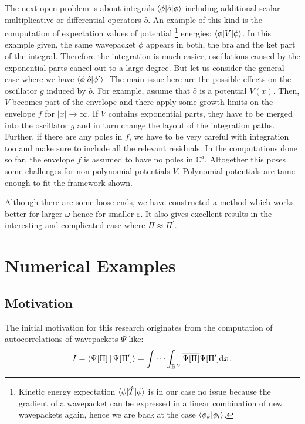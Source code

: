 \documentclass[a4paper,10pt]{article}
\begin{document}
The next open problem is about integrals $\braket{\phi|\hat{o}|\phi}$ including
additional scalar multiplicative or differential operators $\hat{o}$. An example
of this kind is the computation of expectation values of potential
\footnote{Kinetic energy
expectation $\braket{\phi|\hat{T}|\phi}$ is in our case no issue because the
gradient of a wavepacket can be expressed in a linear combination of new wavepackets
again, hence we are back at the case $\braket{\phi_k|\phi_l}$.}
energies: $\braket{\phi|V|\phi}$.
In this example given, the same wavepacket $\phi$ appears in both, the bra and the
ket part of the integral. Therefore the integration is much easier, oscillations
caused by the exponential parts cancel out to a large degree. But let us consider
the general case where we have $\braket{\phi|\hat{o}|\phi^\prime}$. The main issue
here are the possible effects on the oscillator $g$ induced by $\hat{o}$. For example,
assume that $\hat{o}$ is a potential $V(x)$. Then, $V$ becomes part of the envelope
and there apply some growth limits on the envelope $f$ for $|x| \rightarrow \infty$.
If $V$ contains exponential parts, they have to be merged into the oscillator $g$ and
in turn change the layout of the integration paths. Further, if there are any poles
in $f$, we have to be very careful with integration too and make sure to include all
the relevant residuals. In the computations done so far, the envelope $f$ is assumed
to have no poles in $\mathbb{C}^{d}$. Altogether this poses some challenges for
non-polynomial potentials $V$. Polynomial potentials are tame enough to
fit the framework shown.

Although there are some loose ends, we have constructed a method which works better for larger
$\omega$ hence for smaller $\varepsilon$. It also gives excellent results in the
interesting and complicated case where  $\Pi \approx \Pi^{\prime}$.


\section{Numerical Examples}

\subsection{Motivation}


The initial motivation for this research originates from the computation of autocorrelations
of wavepackets $\Psi$ like:
\begin{equation} \label{eq:compute_ac_wavepackets}
  I = \Braket{\Psi[\Pi] | \Psi[\Pi^{\prime}]}
    = \idotsint_{\mathbb{R}^{D}} \overline{\Psi[\Pi]} \Psi[\Pi^{\prime}] \mathrm{d}\underline{x} \,.
\end{equation}
\end{document}
